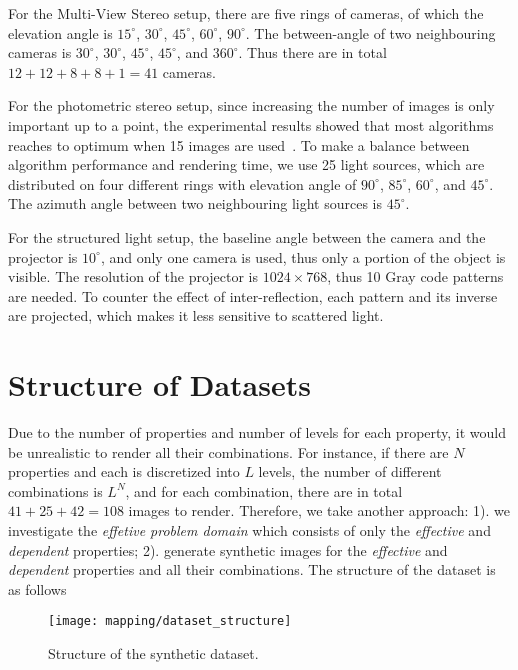 For the Multi-View Stereo setup, there are five rings of cameras, of which the elevation angle is $15^\circ$, $30^\circ$, $45^\circ$, $60^\circ$, $90^\circ$. The between-angle of two neighbouring cameras is $30^\circ$, $30^\circ$, $45^\circ$, $45^\circ$, and $360^\circ$. Thus there are in total $12+12+8+8+1=41$ cameras.

For the photometric stereo setup, since increasing the number of images is only important up to a point, the experimental results showed that most algorithms reaches to optimum when 15 images are used~\cite{Berkiten:2016:ARB}. To make a balance between algorithm performance and rendering time, we use 25 light sources, which are distributed on four different rings with elevation angle of $90^\circ$, $85^\circ$, $60^\circ$, and $45^\circ$. The azimuth angle between two neighbouring light sources is $45^\circ$.

For the structured light setup, the baseline angle between the camera and the projector is $10^\circ$, and only one camera is used, thus only a portion of the object is visible. The resolution of the projector is $1024\times768$, thus 10 Gray code patterns are needed. To counter the effect of inter-reflection, each pattern and its inverse are projected, which makes it less sensitive to scattered light.

\section{Structure of Datasets}
Due to the number of properties and number of levels for each property, it would be unrealistic to render all their combinations. For instance, if there are $N$ properties and each is discretized into $L$ levels, the number of different combinations is $L^N$, and for each combination, there are in total $41+25+42=108$ images to render. Therefore, we take another approach: 1). we investigate the \textit{effetive problem domain} which consists of only the \textit{effective} and \textit{dependent} properties; 2). generate synthetic images for the \textit{effective} and \textit{dependent} properties and all their combinations. The structure of the dataset is as follows
\begin{figure}[!htbp]
\centering
\texttt{[image: mapping/dataset\_structure]}
\caption{Structure of the synthetic dataset.}
\label{fig:dataset_structure}
\end{figure}

